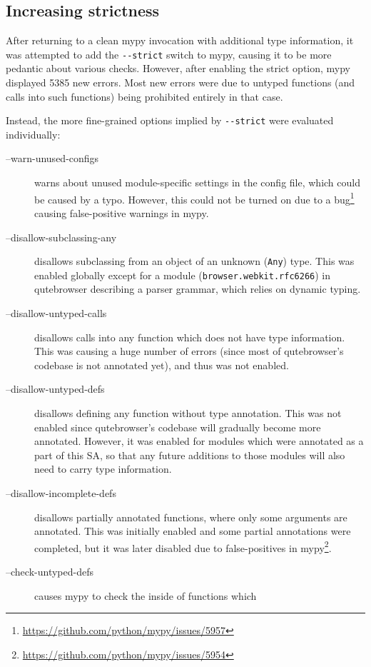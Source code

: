 \documentclass[a4paper,parskip=full]{scrreprt}
\begin{document}
\subsection{Increasing strictness}

After returning to a clean mypy invocation with additional type information, it
was attempted to add the \verb|--strict| switch to mypy, causing it to be more
pedantic about various checks. However, after enabling the strict option, mypy
displayed 5385 new errors. Most new errors were due to untyped functions (and
calls into such functions) being prohibited entirely in that case.

Instead, the more fine-grained options implied by \verb|--strict| were evaluated
individually:

\begin{description}
  \item[--warn-unused-configs] warns about unused module-specific settings in
    the config file, which could be caused by a typo. However, this could not be
    turned on due to a
    bug\footnote{\url{https://github.com/python/mypy/issues/5957}} causing
    false-positive warnings in mypy.
  \item[--disallow-subclassing-any] disallows subclassing from an object of an
    unknown (\verb|Any|) type. This was enabled globally except for a
    module (\verb|browser.webkit.rfc6266|) in qutebrowser describing a parser
    grammar, which relies on dynamic typing.
  \item[--disallow-untyped-calls] disallows calls into any function which does
    not have type information. This was causing a huge number of errors (since
    most of qutebrowser's codebase is not annotated yet), and thus was not
    enabled.
  \item[--disallow-untyped-defs] disallows defining any function without type
    annotation. This was not enabled since qutebrowser's codebase will gradually
    become more annotated. However, it was enabled for modules which were
    annotated as a part of this SA, so that any future additions to those
    modules will also need to carry type information.
  \item[--disallow-incomplete-defs] disallows partially annotated functions,
    where only some arguments are annotated. This was initially enabled and
    some partial annotations were completed, but it was later disabled due to
    false-positives in
    mypy\footnote{\url{https://github.com/python/mypy/issues/5954}}.
  \item[--check-untyped-defs] causes mypy to check the inside of functions which

\end{description}
\end{document}
